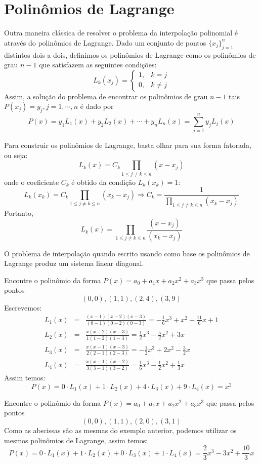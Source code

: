 \section{Polinômios de Lagrange}
Outra maneira clássica de resolver o problema da interpolação polinomial é através do polinômios de Lagrange. Dado um conjunto de pontos $\{x_j\}_{j=1}^n$ distintos dois a dois, definimos os polinômios de Lagrange como os polinômios de grau $n-1$ que satisfazem as seguintes condições:
$$
L_k(x_j)=\left\{\begin{array}{rl}
1,&k=j\\
0,&k\neq j
\end{array}
\right.
$$
Assim, a solução do problema de encontrar os polinômios de grau $n-1$ tais $P(x_j)=y_j,j=1,\cdots,n$ é dado por
$$P(x)=y_1L_1(x)+y_2L_2(x)+\cdots +y_nL_n(x)=\sum_{j=1}^n y_j L_j(x)$$

Para construir os polinômios de Lagrange, basta olhar para sua forma fatorada, ou seja:
$$L_k(x)=C_k\prod_{1\leq j \neq k \leq n } (x-x_j)$$
onde o coeficiente $C_k$ é obtido da condição $L_k(x_k)=1$:
$$L_k(x_k)=C_k\prod_{1\leq j \neq k \leq n } (x_k-x_j) \Longrightarrow C_k=\frac{1}{\prod_{1\leq j \neq k \leq n } (x_k-x_j)}$$
Portanto,
$$L_k(x)=\prod_{1\leq j \neq k \leq n } \frac{(x-x_j)}{(x_k-x_j)}$$

\begin{obs} O problema de interpolação quando escrito usando como base os polinômios de Lagrange produz um sistema linear diagonal.
\end{obs}

\begin{ex}Encontre o polinômio da forma $P(x)=a_0+a_1x+a_2x^2+a_3x^3$ que passa pelos pontos
$$(0,0),(1,1),(2,4),(3,9)$$
Escrevemos:
\begin{eqnarray*}
L_1(x)&=& \frac{(x-1)(x-2)(x-3)}{(0-1)(0-2)(0-3)}=-\frac{1}{6}x^3+x^2-\frac{11}{6}x+1\\
L_2(x)&=& \frac{x(x-2)(x-3)}{1(1-2)(1-3)}=\frac{1}{2}x^3-\frac{5}{2}x^2+3x\\
L_3(x)&=& \frac{x(x-1)(x-3)}{2(2-1)(2-3)}=-\frac{1}{2}x^3+2x^2-\frac{3}{2}x\\
L_4(x)&=& \frac{x(x-1)(x-2)}{3(3-1)(3-2)}=\frac{1}{6}x^3-\frac{1}{2}x^2+\frac{1}{3}x
\end{eqnarray*}
Assim temos:
$$P(x)=0\cdot L_1(x)+1\cdot L_2(x)+4\cdot L_3(x)+9\cdot L_4(x)=x^2$$
\end{ex}

\begin{ex}Encontre o polinômio da forma $P(x)=a_0+a_1x+a_2x^2+a_3x^3$ que passa pelos pontos
$$(0,0),(1,1),(2,0),(3,1)$$
Como as abscissas são as mesmas do exemplo anterior, podemos utilizar os mesmos polinômios de Lagrange, assim temos:
$$P(x)=0\cdot L_1(x)+1\cdot L_2(x)+0\cdot L_3(x)+1\cdot L_4(x)=\frac{2}{3}x^3-3x^2+\frac{10}{3}x$$
\end{ex}



